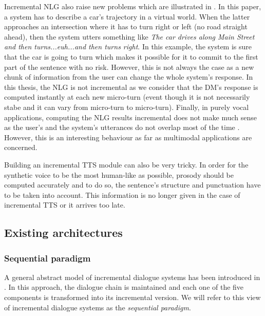 		Incremental NLG also raise new problems which are illustrated in \cite{Baumann2013}. In this paper, a system has to describe a car's trajectory in a virtual world. When the latter approaches an intersection where it has to turn right or left (no road straight ahead), then the system utters something like \textit{The car drives along Main Street and then turns...euh...and then turns right}. In this example, the system is sure that the car is going to turn which makes it possible for it to commit to the first part of the sentence with no risk. However, this is not always the case as a new chunk of information from the user can change the whole system's response. In this thesis, the NLG is not incremental as we consider that the DM's response is computed instantly at each new micro-turn (event though it is not necessarily stabe and it can vary from micro-turn to micro-turn). Finally, in purely vocal applications, computing the NLG results incremental does not make much sense as the user's and the system's utterances do not overlap most of the time \cite{Sacks1974}. However, this is an interesting behaviour as far as multimodal applications are concerned.

		Building an incremental TTS module can also be very tricky. In order for the synthetic voice to be the most human-like as possible, prosody should be computed accurately and to do so, the sentence's structure and punctuation have to be taken into account. This information is no longer given in the case of incremental TTS or it arrives too late.


	\subsection{Existing architectures}
		\subsubsection{Sequential paradigm}
			
			A general abstract model of incremental dialogue systems has been introduced in \cite{Schlangen2011}. In this approach, the dialogue chain is maintained and each one of the five components is transformed into its incremental version. We will refer to this view of incremental dialogue systems as the \textit{sequential paradigm}.
				
